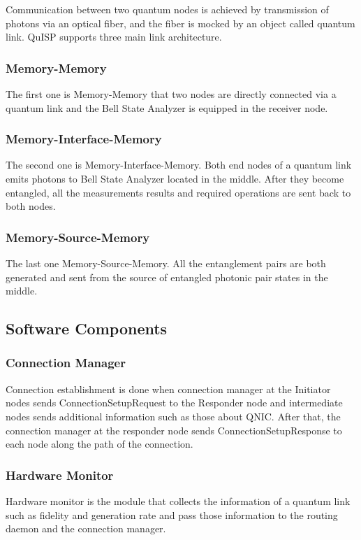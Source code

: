 Communication between two quantum nodes is achieved by transmission of photons via an optical fiber, and the fiber is mocked by an object called quantum link.
QuISP supports three main link architecture. 

\subsubsection{Memory-Memory}
The first one is Memory-Memory that two nodes are directly connected via a quantum link and the Bell State Analyzer is equipped in the receiver node.

\subsubsection{Memory-Interface-Memory}
The second one is Memory-Interface-Memory. Both end nodes of a quantum link emits photons to Bell State Analyzer located in the middle. After they become entangled, all the measurements results and required operations are sent back to both nodes.

\subsubsection{Memory-Source-Memory}
The last one Memory-Source-Memory. All the entanglement pairs are both generated and sent from the source of entangled photonic pair states in the middle.

\subsection{Software Components}

\subsubsection{Connection Manager}

Connection establishment is done when connection manager at the Initiator nodes sends ConnectionSetupRequest to the Responder node and intermediate nodes sends additional information such as those about QNIC.
After that, the connection manager at the responder node sends ConnectionSetupResponse to each node along the path of the connection.

\subsubsection{Hardware Monitor}
Hardware monitor is the module that collects the information of a quantum link such as fidelity and generation rate and pass those information to the routing daemon and the connection manager.

